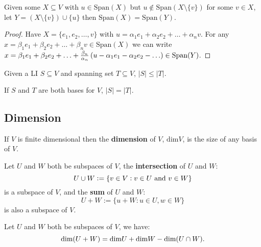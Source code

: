 \documentclass[../Year1.tex]{subfiles}
\begin{document}
\begin{lemma}
    Given some $X\subseteq V$ with $u\in \text{Span}(X)$ but $u\not\in \text{Span}(X\setminus \{v\})$ for some $v\in X$, let $Y=(X\setminus \{v\})\cup \{u\}$ then $\text{Span}(X) = \text{Span}(Y)$.
    \begin{proof}
        Have $X=\{e_1,e_2,\ldots,v\}$ with $u=\alpha_1e_1+\alpha_2e_2+\ldots+\alpha_nv$. For any $x=\beta_1e_1+\beta_2e_2+\ldots+\beta_n v\in\text{Span}(X)$ we can write $x=\beta_1e_1+\beta_2e_2+\ldots+\frac{\beta_n}{\alpha_n}\br{u-\alpha_1e_1-\alpha_2e_2-\ldots}  \in\text{Span}(Y)$.
    \end{proof}
\end{lemma}

\begin{theorem}
    Given a LI $S\subseteq V$ and spanning set $T\subseteq V$, $|S|\leq|T|$.
\end{theorem}

\begin{corollary}
    If $S$ and $T$ are both bases for $V$, $|S|=|T|$.
\end{corollary}

\subsection{Dimension}

\begin{definition}
    If $V$ is finite dimensional then the \textbf{dimension} of $V$, $\text{dim}V$, is the size of any basis of $V$.
\end{definition}

\begin{definition}
    Let $U$ and $W$ both be subspaces of $V$, the \textbf{intersection} of $U$ and $W$: \[
        U\cup W := \{v\in V: v\in U  \ \text{\textcolor{black}{ and }} v\in W\}
    \]
    is a subspace of $V$, and the \textbf{sum} of $U$ and $W$: \[
        U + W := \{u + W: u\in U, w\in W\}
    \]
    is also a subspace of $V$.
\end{definition}

\begin{theorem}
    Let $U$ and $W$ both be subspaces of $V$, we have: \[
        \text{dim}(U+W)=\text{dim}U+\text{dim}W-\text{dim}(U\cap W)
    \textcolor{black}{.}
    \]
\end{theorem}
\end{document}
